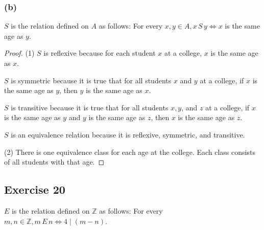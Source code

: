 \documentclass[14pt]{extarticle}
\newcommand{\Z}{\mathbb{Z}}
\begin{document}
\subsubsection{(b)}
\(S\) is the relation defined on \(A\) as follows: For every \(x, y \in A, x \,S\, y \iff x\) is the same age as \(y\).

\begin{proof}
        (1) \(S\) is reflexive because for each student \(x\) at a college, \(x\) is the same age as \(x\).

        \(S\) is symmetric because it is true that for all students \(x\) and \(y\) at a college, if \(x\) is the same age as
        \(y\), then \(y\) is the same age as \(x\).

        \(S\) is transitive because it is true that for all students \(x, y\), and \(z\) at a college, if \(x\) is the
        same age as \(y\) and \(y\) is the same age as \(z\), then \(x\) is the same age as \(z\).

        \(S\) is an equivalence relation because it is reflexive, symmetric, and transitive.

        (2) There is one equivalence class for each age at the college. Each class consists of all students with that age.
\end{proof}

\subsection{Exercise 20}
\(E\) is the relation defined on \(\Z\) as follows: For every \(m, n \in \Z, m \,E\, n \iff 4 \mid (m - n)\).
\end{document}

